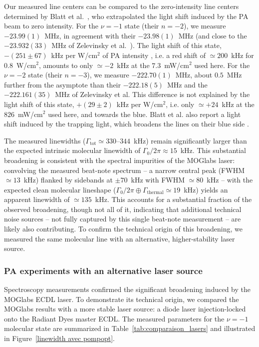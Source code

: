 Our measured line centers can be compared to the zero-intensity line centers determined by
Blatt et al.~\cite{blatt_measurement_2011}, who extrapolated the light shift induced by the PA
beam to zero intensity. For the $\nu=-1$ state (their $n=-2$), we measure $-23.99(1)$~MHz,
in agreement with their $-23.98(1)$~MHz (and close to the $-23.932(33)$~MHz of Zelevinsky
et al.~\cite{zelevinsky_narrow_2006}). The light shift of this state, $-(251\pm67)$~kHz per
W/cm$^2$ of PA intensity \cite{blatt_measurement_2011}, i.e. a red shift of $\simeq200$~kHz
for $0.8$~W/cm$^2$, amounts to only $\simeq-2$~kHz at the $7.3$~mW/cm$^2$ used here. For the
$\nu=-2$ state (their $n=-3$), we measure $-222.70(1)$~MHz, about $0.5$~MHz further from the
asymptote than their $-222.18(5)$~MHz and the $-222.161(35)$~MHz of Zelevinsky et al. This
difference is not explained by the light shift of this state, $+(29\pm2)$~kHz per W/cm$^2$,
i.e. only $\simeq+24$~kHz at the $826$~mW/cm$^2$ used here, and towards the blue. Blatt et al.
also report a light shift induced by the trapping light, which broadens the lines on their
blue side \cite{blatt_systematic_2011}.

The measured linewidths ($\Gamma_{\text{tot}} \simeq 330\text{--}344$~kHz) remain
significantly larger than the expected intrinsic molecular linewidth of
$\Gamma_0/2\pi \approx 15$~kHz. This substantial broadening is consistent with the spectral
impurities of the MOGlabs laser: convolving the measured beat-note spectrum -- a narrow
central peak (FWHM $\simeq 13$~kHz) flanked by sidebands at $\pm 70$~kHz with
FWHM $\simeq 80$~kHz -- with the expected clean molecular lineshape
($\Gamma_0/2\pi \oplus \Gamma_{\text{thermal}} \simeq 19$~kHz) yields an apparent linewidth of
$\simeq 135$~kHz. This accounts for a substantial fraction of the observed broadening,
though not all of it, indicating that additional technical noise sources -- not fully
captured by this single beat-note measurement -- are likely also contributing. To
confirm the technical origin of this broadening, we measured the same molecular line
with an alternative, higher-stability laser source.


\subsubsection{PA experiments with an alternative laser source}
Spectroscopy measurements confirmed the significant broadening induced by the MOGlabs ECDL laser. To demonstrate its technical origin, we compared the MOGlabs results with a more stable laser source: a diode laser 
injection-locked onto the Radiant Dyes master ECDL. 
The measured parameters for the $\nu = -1$ molecular state are summarized in Table~\ref{tab:comparaison_lasers} and illustrated in Figure~\ref{linewidth avec pompopt}.

